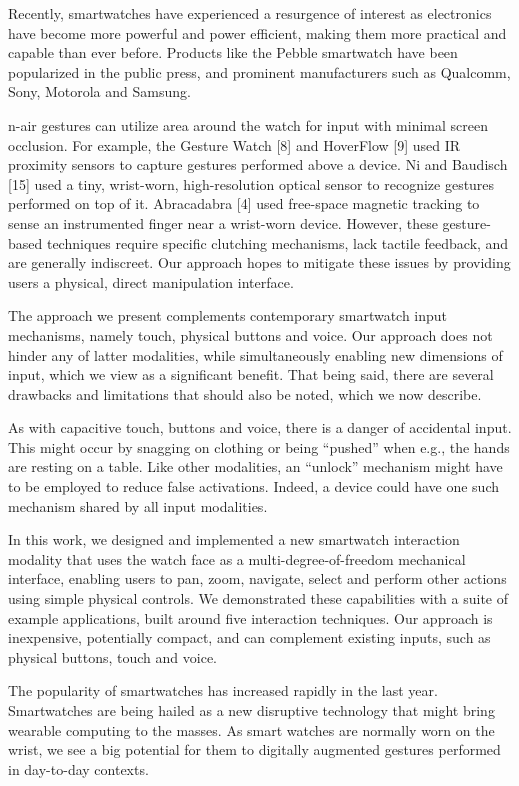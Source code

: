 \documentclass{article}
\begin{document}
Recently, smartwatches have experienced a resurgence of
interest as electronics have become more powerful and
power efficient, making them more practical and capable
than ever before. Products like the Pebble smartwatch have
been popularized in the public press, and prominent manufacturers
such as Qualcomm, Sony, Motorola and Samsung.

n-air gestures can utilize area around the watch for input
with minimal screen occlusion. For example, the Gesture
Watch [8] and HoverFlow [9] used IR proximity sensors to
capture gestures performed above a device. Ni and Baudisch
[15] used a tiny, wrist-worn, high-resolution optical
sensor to recognize gestures performed on top of it. Abracadabra
[4] used free-space magnetic tracking to sense an instrumented
finger near a wrist-worn device. However, these
gesture-based techniques require specific clutching mechanisms,
lack tactile feedback, and are generally indiscreet.
Our approach hopes to mitigate these issues by providing
users a physical, direct manipulation interface.

The approach we present complements contemporary smartwatch
input mechanisms, namely touch, physical buttons
and voice. Our approach does not hinder any of latter modalities,
while simultaneously enabling new dimensions of
input, which we view as a significant benefit. That being
said, there are several drawbacks and limitations that should
also be noted, which we now describe.

As with capacitive touch, buttons and voice, there is a danger
of accidental input. This might occur by snagging on
clothing or being “pushed” when e.g., the hands are resting
on a table. Like other modalities, an “unlock” mechanism
might have to be employed to reduce false activations. Indeed,
a device could have one such mechanism shared by
all input modalities. 

In this work, we designed and implemented a new smartwatch
interaction modality that uses the watch face as a
multi-degree-of-freedom mechanical interface, enabling users
to pan, zoom, navigate, select and perform other actions
using simple physical controls. We demonstrated these capabilities
with a suite of example applications, built around
five interaction techniques. Our approach is inexpensive,
potentially compact, and can complement existing inputs,
such as physical buttons, touch and voice.

The popularity of smartwatches has increased rapidly in
the last year. Smartwatches are being hailed as a new
disruptive technology that might bring wearable
computing to the masses. As smart watches are
normally worn on the wrist, we see a big potential for
them to digitally augmented gestures performed in
day-to-day contexts. 
\end{document}
